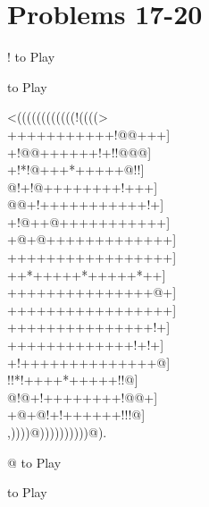 \documentclass[mcrownvopaper,10pt,onecolumn,final]{memoir}
\begin{document}
\section{Problems 17-20}
\begin{minipage}[c]{0.5\linewidth}
    \hspace{8.3mm} {\gnos%
        !
    }
    to Play
\end{minipage}
\begin{minipage}[c]{0.5\linewidth}
    \hspace{27mm}{\gnos%
        @
    }
    to Play
\end{minipage}
\begin{minipage}[c]{\linewidth}
    \centering
    {\gnos%
          <((((((((((((!((((>\\
    +++++++++++!@@+++]\\
    +!@@++++++!+!!@@@]\\
    +!*!@+++*+++++@!!]\\
    @!+!@++++++++!+++]\\
    @@+!+++++++++++!+]\\
    +!@++@+++++++++++]\\
    +@+@+++++++++++++]\\
    +++++++++++++++++]\\
    ++*+++++*+++++*++]\\
    +++++++++++++++@+]\\
    +++++++++++++++++]\\
    +++++++++++++++!+]\\
    +++++++++++++!+!+]\\
    +!++++++++++++++@]\\
    !!*!++++*+++++!!@]\\
    @!@+!++++++++!@@+]\\
    +@+@!+!++++++!!!@]\\
          ,))))@))))))))))@).\\
    }
\end{minipage}
\begin{minipage}[c]{0.5\linewidth}
    \hspace{8.3mm} {\gnos%
        @
    }
    to Play
\end{minipage}
\begin{minipage}[c]{0.5\linewidth}
    \hspace{27mm}{\gnos%
        @
    }
    to Play
\end{minipage}
\newpage
\end{document}
